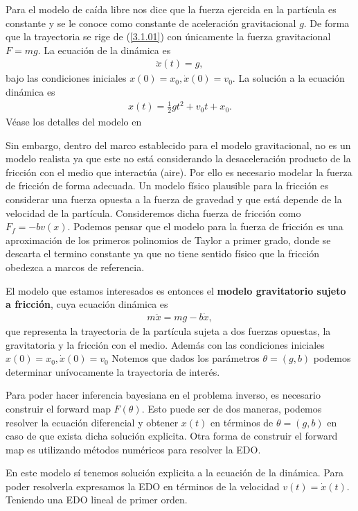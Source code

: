 Para el modelo de caída libre nos dice que la fuerza ejercida en la partícula es constante y se le conoce como constante de aceleración gravitacional $g$. De forma que la trayectoria se rige de (\ref{3.1.01}) con únicamente la fuerza gravitacional $F = mg$. La ecuación de la dinámica es 
\begin{align*}
    \ddot{x}(t) = g,
\end{align*}
bajo las condiciones iniciales $x(0) = x_0, \dot{x}(0) = v_0$. La solución a la ecuación dinámica es 
\begin{align*}
    x(t) = \frac{1}{2}gt^2 + v_0 t + x_0.
\end{align*}
Véase los detalles del modelo en \cite{alonso1970fisica}

Sin embargo, dentro del marco establecido para el modelo gravitacional, no es un modelo realista ya que este no está considerando la desaceleración producto de la fricción con el medio que interactúa (aire). Por ello es necesario modelar la fuerza de fricción de forma adecuada. Un modelo físico plausible para la fricción es considerar una fuerza opuesta a la fuerza de gravedad y que está depende de la velocidad de la partícula. Consideremos dicha fuerza de fricción como $F_f = -bv(x) $. Podemos pensar que el modelo para la fuerza de fricción es una aproximación de los primeros polinomios de Taylor a primer grado, donde se descarta el termino constante ya que no tiene sentido físico que la fricción obedezca a marcos de referencia. 

El modelo que estamos interesados es entonces el \textbf{modelo gravitatorio sujeto a fricción}, cuya ecuación dinámica es 
\begin{align}
    m \ddot{x} = mg - b\dot{x},
    \label{3.1.03}
\end{align}
que representa la trayectoria de la partícula sujeta a dos fuerzas opuestas, la gravitatoria y la fricción con el medio. Además con las condiciones iniciales $x(0) = x_0, \dot{x}(0) = v_0$ Notemos que dados los parámetros $\theta = (g,b)$ podemos determinar unívocamente la trayectoria de interés. 

Para poder hacer inferencia bayesiana en el problema inverso, es necesario construir el forward map $F(\theta)$. Esto puede ser de dos maneras, podemos resolver la ecuación diferencial y obtener $x(t)$ en términos de $\theta = (g,b)$ en caso de que exista dicha solución explicita. Otra forma de construir el forward map es utilizando métodos numéricos para resolver la EDO.

En este modelo sí tenemos solución explicita a la ecuación de la dinámica. Para poder resolverla expresamos la EDO en términos de la velocidad $v(t) = \dot{x}(t)$. Teniendo una EDO lineal de primer orden.

